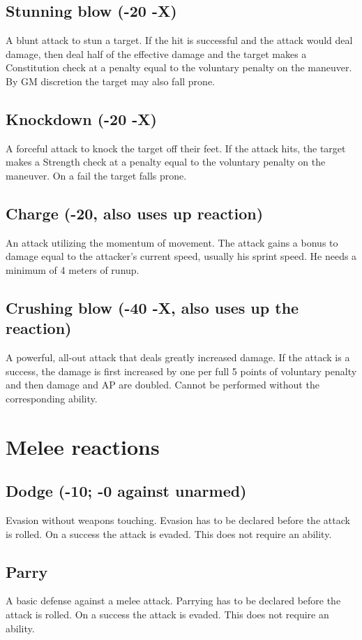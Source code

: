 \subsection*{Stunning blow (-20 -X)}
A blunt attack to stun a target. If the hit is successful and the attack would deal damage, then deal half of the effective damage and the target makes a Constitution check at a penalty equal to the voluntary penalty on the maneuver. By GM discretion the target may also fall prone.
\subsection*{Knockdown (-20 -X)}
A forceful attack to knock the target off their feet. If the attack hits, the target makes a Strength check at a penalty equal to the voluntary penalty on the maneuver. On a fail the target falls prone.
\subsection*{Charge (-20, also uses up reaction)}
An attack utilizing the momentum of movement. The attack gains a bonus to damage equal to the attacker’s current speed, usually his sprint speed. He needs a minimum of 4 meters of runup.
\subsection*{Crushing blow (-40 -X, also uses up the reaction)}
A powerful, all-out attack that deals greatly increased damage. If the attack is a success, the damage is first increased by one per full 5 points of voluntary penalty and then damage and AP are doubled. Cannot be performed without the corresponding ability.

\section{Melee reactions}
\subsection*{Dodge (-10; -0 against unarmed)}
Evasion without weapons touching. Evasion has to be declared before the attack is rolled. On a success the attack is evaded. This does not require an ability.
\subsection*{Parry}
A basic defense against a melee attack. Parrying has to be declared before the attack is rolled. On a success the attack is evaded. This does not require an ability.
